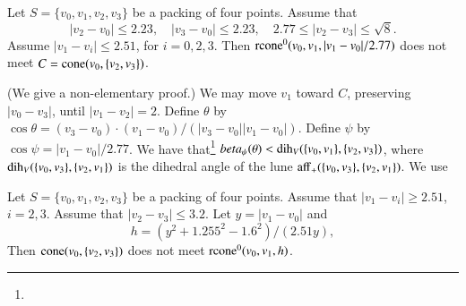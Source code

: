 \begin{tarskidata}

\begin{tarski}

\begin{lemma}
Let $S=\{v_0,v_1,v_2,v_3\}$ be a packing of four points.
Assume that
   $$
   |v_2-v_0|\le 2.23,\quad |v_3-v_0|\le 2.23,\quad 2.77\le |v_2-v_3|\le\sqrt8.
   $$
Assume $|v_1-v_i|\le 2.51$, for $i=0,2,3$.
Then ${\operatorname{rcone}}^0(v_0,v_1,|v_1-v_0|/2.77)$ does not meet
$C={\operatorname{cone}}(v_0,\{v_2,v_3\})$.
\end{lemma}


\begin{proved} (We give a non-elementary proof.)  We may
move $v_1$ toward $C$, preserving $|v_0-v_3|$, until $|v_1-v_2|=2$.
Define $\theta$ by $\cos\theta = (v_3-v_0)\cdot (v_1-v_0)/(|v_3-v_0||v_1-v_0|)$.
Define $\psi$ by $\cos\psi = |v_1-v_0|/2.77$.
We have that\footnote{}
    $beta_\psi(\theta) < \operatorname{dih}_V(\{v_0,v_1\},\{v_2,v_3\})$,
where $\operatorname{dih}_V(\{v_0,v_3\},\{v_2,v_1\})$ is the dihedral angle 
of the lune ${\operatorname{aff}}_+(\{v_0,v_3\},\{v_2,v_1\})$.   We use
\swallowed\end{proved}
\end{tarski}




\begin{tarski}

\begin{lemma}
Let $S=\{v_0,v_1,v_2,v_3\}$ be a packing of four points.
Assume that
$|v_1-v_i|\ge 2.51$, $i=2,3$.
Assume that $|v_2-v_3|\le 3.2$.
Let $y = |v_1-v_0|$ and 
$$
  h=(y^2+1.255^2-1.6^2)/(2.51 y),
$$
Then ${\operatorname{cone}}(v_0,\{v_2,v_3\})$ does not meet
${\operatorname{rcone}}^0(v_0,v_1,h)$.
\end{lemma}



\end{tarski}
\end{tarskidata}
